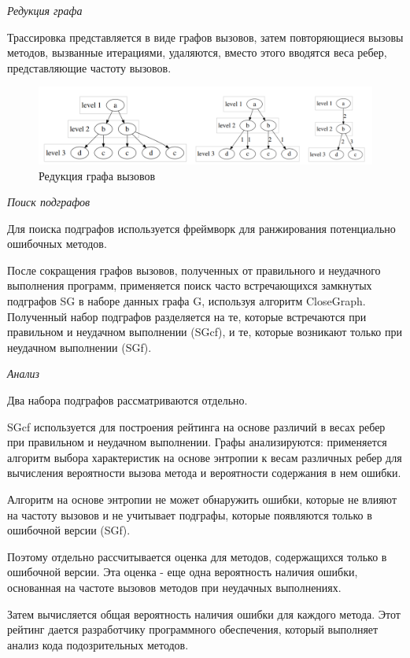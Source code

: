 \textit{Редукция графа}

Трассировка представляется в виде графов вызовов, затем повторяющиеся вызовы методов, вызванные итерациями, удаляются, вместо этого вводятся веса ребер, представляющие частоту вызовов. 

\begin{figure}[h]
	\centering
	\includegraphics[width=1\textwidth]{ResearchNotes/rndhpc_not_edt_2021_11_10/krekhtunova/reduction.png}
	\caption{Редукция графа вызовов} 
\end{figure}


\textit{Поиск подграфов}

Для поиска подграфов используется фреймворк для ранжирования потенциально ошибочных методов.

После сокращения графов вызовов, полученных от правильного и неудачного выполнения программ, применяется поиск часто встречающихся замкнутых подграфов SG в наборе данных графа G, используя алгоритм CloseGraph. Полученный набор подграфов разделяется на те, которые встречаются при правильном и неудачном выполнении (SGcf), и те, которые возникают только при неудачном выполнении (SGf).
\newline

\textit{Анализ}

Два набора подграфов рассматриваются отдельно.

SGcf используется для построения рейтинга на основе различий в весах ребер при правильном и неудачном выполнении. Графы анализируются: применяется алгоритм выбора характеристик на основе энтропии к весам различных ребер для вычисления вероятности вызова метода и вероятности содержания в нем ошибки.

Алгоритм на основе энтропии не может обнаружить ошибки, которые не влияют на частоту вызовов и не учитывает подграфы, которые появляются только в ошибочной версии (SGf).

Поэтому отдельно рассчитывается оценка для методов, содержащихся только в ошибочной версии. Эта оценка - еще одна вероятность наличия ошибки, основанная на частоте вызовов методов при неудачных выполнениях.

Затем вычисляется общая вероятность наличия ошибки для каждого метода. Этот рейтинг дается разработчику программного обеспечения, который выполняет анализ кода подозрительных методов.

